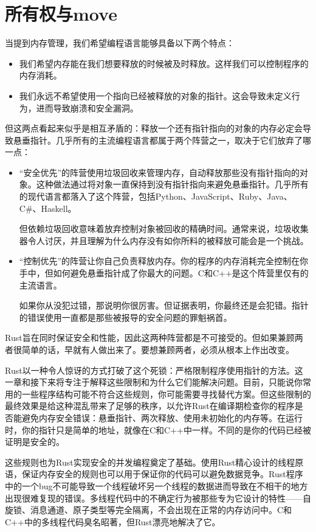 \chapter{所有权与move}\label{ch04}

当提到内存管理，我们希望编程语言能够具备以下两个特点：
\begin{itemize}
    \item 我们希望内存能在我们想要释放的时候被及时释放。这样我们可以控制程序的内存消耗。
    \item 我们永远不希望使用一个指向已经被释放的对象的指针。这会导致未定义行为，进而导致崩溃和安全漏洞。
\end{itemize}

但这两点看起来似乎是相互矛盾的：释放一个还有指针指向的对象的内存必定会导致悬垂指针。几乎所有的主流编程语言都属于两个阵营之一，取决于它们放弃了哪一点：
\begin{itemize}
    \item “安全优先”的阵营使用垃圾回收来管理内存，自动释放那些没有指针指向的对象。这种做法通过将对象一直保持到没有指针指向来避免悬垂指针。几乎所有的现代语言都落入了这个阵营，包括Python、JavaScript、Ruby、Java、C\#、Haskell。

    但依赖垃圾回收意味着放弃控制对象被回收的精确时间。通常来说，垃圾收集器令人讨厌，并且理解为什么内存没有如你所料的被释放可能会是一个挑战。

    \item “控制优先”的阵营让你自己负责释放内存。你的程序的内存消耗完全控制在你手中，但如何避免悬垂指针成了你最大的问题。C和C++是这个阵营里仅有的主流语言。

    如果你从没犯过错，那说明你很厉害。但证据表明，你最终还是会犯错。指针的错误使用一直都是那些被报导的安全问题的罪魁祸首。
\end{itemize}

Rust旨在同时保证安全和性能，因此这两种阵营都是不可接受的。但如果兼顾两者很简单的话，早就有人做出来了。要想兼顾两者，必须从根本上作出改变。

Rust以一种令人惊讶的方式打破了这个死锁：严格限制程序使用指针的方法。这一章和接下来将专注于解释这些限制和为什么它们能解决问题。目前，只能说你常用的一些程序结构可能不符合这些规则，你可能需要寻找替代方案。但这些限制的最终效果是给这种混乱带来了足够的秩序，以允许Rust在编译期检查你的程序是否能避免内存安全错误：悬垂指针、两次释放、使用未初始化的内存等。在运行时，你的指针只是简单的地址，就像在C和C++中一样。不同的是你的代码已经被证明是安全的。

这些规则也为Rust实现安全的并发编程奠定了基础。使用Rust精心设计的线程原语，保证内存安全的规则也可以用于保证你的代码可以避免数据竞争。Rust程序中的一个bug不可能导致一个线程破坏另一个线程的数据进而导致在不相干的地方出现很难复现的错误。多线程代码中的不确定行为被那些专为它设计的特性——自旋锁、消息通道、原子类型等完全隔离，不会出现在正常的内存访问中。C和C++中的多线程代码臭名昭著，但Rust漂亮地解决了它。

